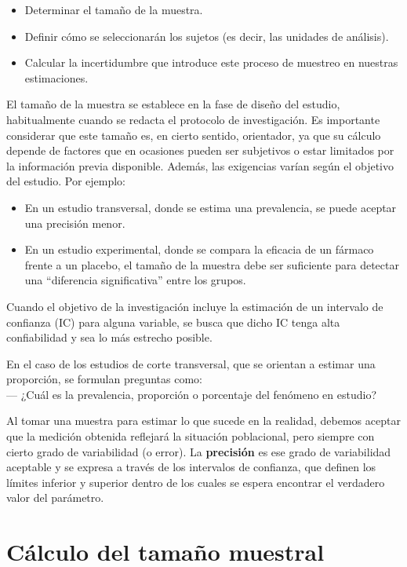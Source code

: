 \documentclass[
  spanish,
  a4paper,
]{scrbook}
\begin{document}
\begin{itemize}
\item
  Determinar el tamaño de la muestra.
\item
  Definir cómo se seleccionarán los sujetos (es decir, las unidades de
  análisis).
\item
  Calcular la incertidumbre que introduce este proceso de muestreo en
  nuestras estimaciones.
\end{itemize}

El tamaño de la muestra se establece en la fase de diseño del estudio,
habitualmente cuando se redacta el protocolo de investigación. Es
importante considerar que este tamaño es, en cierto sentido, orientador,
ya que su cálculo depende de factores que en ocasiones pueden ser
subjetivos o estar limitados por la información previa disponible.
Además, las exigencias varían según el objetivo del estudio. Por
ejemplo:

\begin{itemize}
\item
  En un estudio transversal, donde se estima una prevalencia, se puede
  aceptar una precisión menor.
\item
  En un estudio experimental, donde se compara la eficacia de un fármaco
  frente a un placebo, el tamaño de la muestra debe ser suficiente para
  detectar una ``diferencia significativa'' entre los grupos.
\end{itemize}

Cuando el objetivo de la investigación incluye la estimación de un
intervalo de confianza (IC) para alguna variable, se busca que dicho IC
tenga alta confiabilidad y sea lo más estrecho posible.

En el caso de los estudios de corte transversal, que se orientan a
estimar una proporción, se formulan preguntas como:\\
--- ¿Cuál es la prevalencia, proporción o porcentaje del fenómeno en
estudio?

Al tomar una muestra para estimar lo que sucede en la realidad, debemos
aceptar que la medición obtenida reflejará la situación poblacional,
pero siempre con cierto grado de variabilidad (o error). La
\textbf{precisión} es ese grado de variabilidad aceptable y se expresa a
través de los intervalos de confianza, que definen los límites inferior
y superior dentro de los cuales se espera encontrar el verdadero valor
del parámetro.

\section{Cálculo del tamaño
muestral}\label{cuxe1lculo-del-tamauxf1o-muestral}
\end{document}
